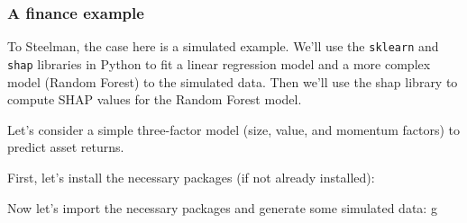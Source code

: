 \documentclass[
  letterpaper,
  DIV=11,
  numbers=noendperiod]{scrartcl}
\begin{document}
\hypertarget{a-finance-example}{%
\subsubsection{A finance example}\label{a-finance-example}}

To Steelman, the case here is a simulated example. We'll use the
\texttt{sklearn} and \texttt{shap} libraries in Python to fit a linear
regression model and a more complex model (Random Forest) to the
simulated data. Then we'll use the shap library to compute SHAP values
for the Random Forest model.

Let's consider a simple three-factor model (size, value, and momentum
factors) to predict asset returns.

First, let's install the necessary packages (if not already installed):

Now let's import the necessary packages and generate some simulated
data: g
\end{document}
